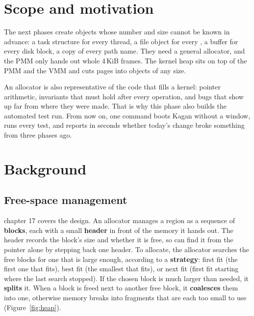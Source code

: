 \documentclass[11pt,a4paper]{article}
\begin{document}


\section{Scope and motivation}

The next phases create objects whose number and size cannot be known in advance: a task structure for every thread,
a file object for every , a buffer for every disk block, a copy of every path name. They need a general
allocator, and the PMM only hands out whole 4\,KiB frames. The kernel heap sits on top of the PMM and the VMM and
cuts pages into objects of any size.

An allocator is also representative of the code that fills a kernel: pointer
arithmetic, invariants that must hold after every operation, and bugs that show up far from where they were made.
That is why this phase also builds the automated test run. From now on, one command boots Kagan without a window,
runs every test, and reports in seconds whether today's change broke something from three phases ago.

\section{Background}

\subsection{Free-space management}

\OSTEP chapter 17 covers the design. An allocator manages a region as a sequence of \textbf{blocks}, each with a
small \textbf{header} in front of the memory it hands out. The header records the block's size and whether it is
free, so  can find it from the pointer alone by stepping back one header. To allocate, the allocator
searches the free blocks for one that is large enough, according to a \textbf{strategy}: first fit (the first one
that fits), best fit (the smallest that fits), or next fit (first fit starting where the last search stopped). If the
chosen block is much larger than needed, it \textbf{splits} it. When a block is freed next to another free block, it
\textbf{coalesces} them into one, otherwise memory breaks into fragments that are each too small to use
(Figure~\ref{fig:heap}).
\end{document}
